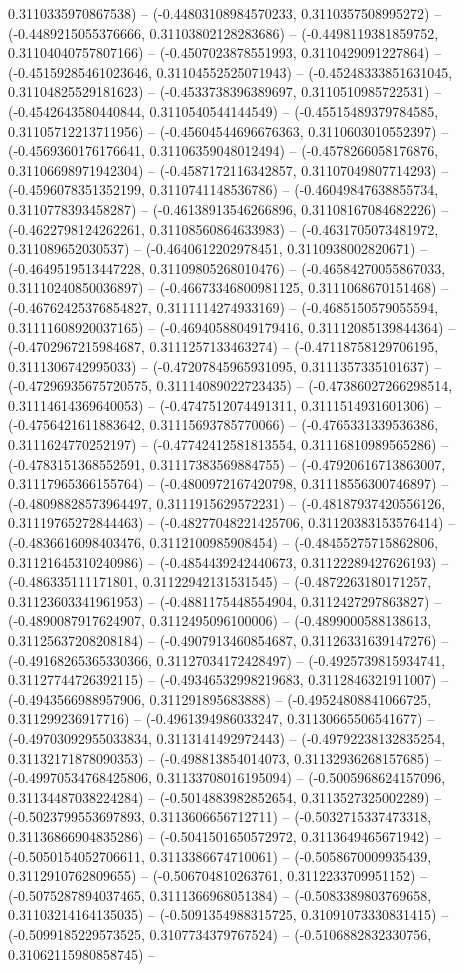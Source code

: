 0.3110335970867538) -- (-0.44803108984570233, 0.3110357508995272) -- (-0.4489215055376666, 0.31103802128283686) -- (-0.4498119381859752, 0.31104040757807166) -- (-0.4507023878551993, 0.3110429091227864) -- (-0.45159285461023646, 0.31104552525071943) -- (-0.45248333851631045, 0.31104825529181623) -- (-0.4533738396389697, 0.3110510985722531) -- (-0.4542643580440844, 0.3110540544144549) -- (-0.45515489379784585, 0.31105712213711956) -- (-0.45604544696676363, 0.3110603010552397) -- (-0.4569360176176641, 0.31106359048012494) -- (-0.4578266058176876, 0.31106698971942304) -- (-0.4587172116342857, 0.31107049807714293) -- (-0.4596078351352199, 0.3110741148536786) -- (-0.46049847638855734, 0.3110778393458287) -- (-0.46138913546266896, 0.31108167084682226) -- (-0.4622798124262261, 0.31108560864633983) -- (-0.4631705073481972, 0.311089652030537) -- (-0.4640612202978451, 0.3110938002820671) -- (-0.4649519513447228, 0.31109805268010476) -- (-0.46584270055867033, 0.31110240850036897) -- (-0.46673346800981125, 0.3111068670151468) -- (-0.46762425376854827, 0.3111114274933169) -- (-0.4685150579055594, 0.31111608920037165) -- (-0.46940588049179416, 0.31112085139844364) -- (-0.4702967215984687, 0.3111257133463274) -- (-0.47118758129706195, 0.3111306742995033) -- (-0.47207845965931095, 0.3111357335101637) -- (-0.47296935675720575, 0.31114089022723435) -- (-0.47386027266298514, 0.31114614369640053) -- (-0.4747512074491311, 0.3111514931601306) -- (-0.4756421611883642, 0.31115693785770066) -- (-0.4765331339536386, 0.3111624770252197) -- (-0.47742412581813554, 0.31116810989565286) -- (-0.4783151368552591, 0.31117383569884755) -- (-0.47920616713863007, 0.31117965366155764) -- (-0.4800972167420798, 0.31118556300746897) -- (-0.48098828573964497, 0.3111915629572231) -- (-0.48187937420556126, 0.31119765272844463) -- (-0.48277048221425706, 0.31120383153576414) -- (-0.4836616098403476, 0.3112100985908454) -- (-0.48455275715862806, 0.31121645310240986) -- (-0.4854439242440673, 0.31122289427626193) -- (-0.486335111171801, 0.31122942131531545) -- (-0.4872263180171257, 0.31123603341961953) -- (-0.4881175448554904, 0.3112427297863827) -- (-0.4890087917624907, 0.3112495096100006) -- (-0.4899000588138613, 0.31125637208208184) -- (-0.4907913460854687, 0.31126331639147276) -- (-0.49168265365330366, 0.31127034172428497) -- (-0.4925739815934741, 0.31127744726392115) -- (-0.49346532998219683, 0.3112846321911007) -- (-0.4943566988957906, 0.311291895683888) -- (-0.49524808841066725, 0.311299236917716) -- (-0.4961394986033247, 0.31130665506541677) -- (-0.49703092955033834, 0.3113141492972443) -- (-0.49792238132835254, 0.31132171878090353) -- (-0.498813854014073, 0.31132936268157685) -- (-0.49970534768425806, 0.31133708016195094) -- (-0.5005968624157096, 0.31134487038224284) -- (-0.5014883982852654, 0.3113527325002289) -- (-0.5023799553697893, 0.3113606656712711) -- (-0.5032715337473318, 0.31136866904835286) -- (-0.5041501650572972, 0.3113649465671942) -- (-0.5050154052706611, 0.3113386674710061) -- (-0.5058670009935439, 0.3112910762809655) -- (-0.506704810263761, 0.3112233709951152) -- (-0.5075287894037465, 0.3111366968051384) -- (-0.5083389803769658, 0.31103214164135035) -- (-0.5091354988315725, 0.31091073330831415) -- (-0.5099185229573525, 0.3107734379767524) -- (-0.5106882832330756, 0.31062115980858745) -- 